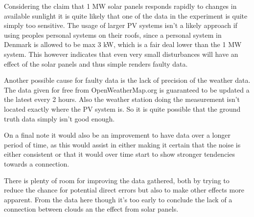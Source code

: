 Considering the claim that 1 MW solar panels responds rapidly to
changes in available sunlight \citep{cloudTrack} it is quite likely
that one of the data in the experiment is quite simply too sensitive.
The usage of larger PV systems isn't a likely approach if using
peoples personal systems on their roofs, since a personal system in
Denmark is allowed to be max 3 kW, which is a fair deal lower than the
1 MW system.  This however indicates that even very small disturbances
will have an effect of the solar panels and thus simple renders faulty
data.

Another possible cause for faulty data is the lack of precision of the
weather data.  The data given for free from OpenWeatherMap.org is
guaranteed to be updated a the latest every 2 hours.  Also the weather
station doing the measurement isn't located exactly where the PV
system is.  So it is quite possible that the ground truth data simply
isn't good enough.

On a final note it would also be an improvement to have data over a
longer period of time, as this would assist in either making it
certain that the noise is either consistent or that it would over time
start to show stronger tendencies towards a connection.

There is plenty of room for improving the data gathered, both by
trying to reduce the chance for potential direct errors but also to
make other effects more apparent.  From the data here though it's too
early to conclude the lack of a connection between clouds an the
effect from solar panels.


